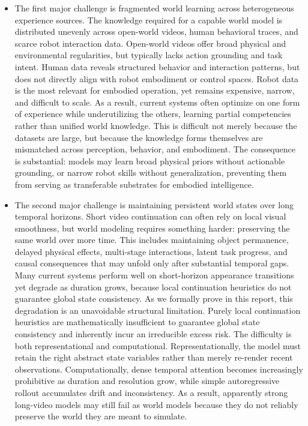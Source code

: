 \documentclass{llmxive}
\begin{document}
\begin{itemize}
\item The first major challenge is fragmented world learning across heterogeneous experience sources. The knowledge required for a capable world model is distributed unevenly across open-world videos, human behavioral traces, and scarce robot interaction data. Open-world videos offer broad physical and environmental regularities, but typically lacks action grounding and task intent. Human data reveals structured behavior and interaction patterns, but does not directly align with robot embodiment or control spaces. Robot data is the most relevant for embodied operation, yet remains expensive, narrow, and difficult to scale. As a result, current systems often optimize on one form of experience while underutilizing the others, learning partial competencies rather than unified world knowledge. This is difficult not merely because the datasets are large, but because the knowledge forms themselves are mismatched across perception, behavior, and embodiment. The consequence is substantial: models may learn broad physical priors without actionable grounding, or narrow robot skills without generalization, preventing them from serving as transferable substrates for embodied intelligence.

\item The second major challenge is maintaining persistent world states over long temporal horizons. Short video continuation can often rely on local visual smoothness, but world modeling requires something harder: preserving the same world over more time. This includes maintaining object permanence, delayed physical effects, multi-stage interactions, latent task progress, and causal consequences that may unfold only after substantial temporal gaps. Many current systems perform well on short-horizon appearance transitions yet degrade as duration grows, because local continuation heuristics do not guarantee global state consistency. As we formally prove in this report, this degradation is an unavoidable structural limitation. Purely local continuation heuristics are mathematically insufficient to guarantee global state consistency and inherently incur an irreducible excess risk. The difficulty is both representational and computational. Representationally, the model must retain the right abstract state variables rather than merely re-render recent observations. Computationally, dense temporal attention becomes increasingly prohibitive as duration and resolution grow, while simple autoregressive rollout accumulates drift and inconsistency. As a result, apparently strong long-video models may still fail as world models because they do not reliably preserve the world they are meant to simulate.


\end{itemize}
\end{document}
